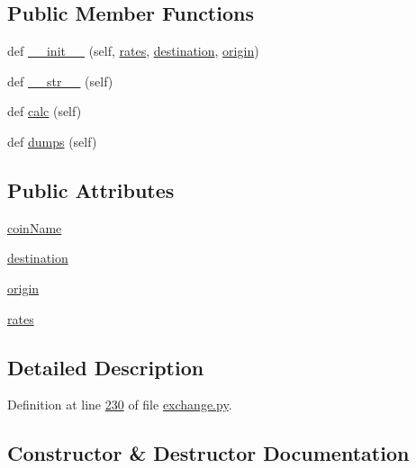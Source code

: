 \subsection*{Public Member Functions}
\begin{DoxyCompactItemize}
\item 
def \hyperlink{classexchange_1_1_differences_a4a3bc979ffeac30f0d767d08a9a1b518}{\+\_\+\+\_\+init\+\_\+\+\_\+} (self, \hyperlink{classexchange_1_1_differences_a821ecbc04dae3081f634a28d377c69c3}{rates}, \hyperlink{classexchange_1_1_differences_a0092f9963e867db55e7ea2f0bab1b07e}{destination}, \hyperlink{classexchange_1_1_differences_a25acbe37294f8b4eb5bf909cd84a0b9d}{origin})
\item 
def \hyperlink{classexchange_1_1_differences_af7c7e7d5c268a1229f78f0ee911cbbe9}{\+\_\+\+\_\+str\+\_\+\+\_\+} (self)
\item 
def \hyperlink{classexchange_1_1_differences_abf44b47cfb95a1f4eadfb99f4f8f5468}{calc} (self)
\item 
def \hyperlink{classexchange_1_1_differences_adf6009f54dd9051816afd1d0713b9e90}{dumps} (self)
\end{DoxyCompactItemize}
\subsection*{Public Attributes}
\begin{DoxyCompactItemize}
\item 
\hyperlink{classexchange_1_1_differences_a5966244f2ee3307e771063fd9f204bf2}{coin\+Name}
\item 
\hyperlink{classexchange_1_1_differences_a0092f9963e867db55e7ea2f0bab1b07e}{destination}
\item 
\hyperlink{classexchange_1_1_differences_a25acbe37294f8b4eb5bf909cd84a0b9d}{origin}
\item 
\hyperlink{classexchange_1_1_differences_a821ecbc04dae3081f634a28d377c69c3}{rates}
\end{DoxyCompactItemize}


\subsection{Detailed Description}


Definition at line \hyperlink{exchange_8py_source_l00230}{230} of file \hyperlink{exchange_8py_source}{exchange.\+py}.



\subsection{Constructor \& Destructor Documentation}
